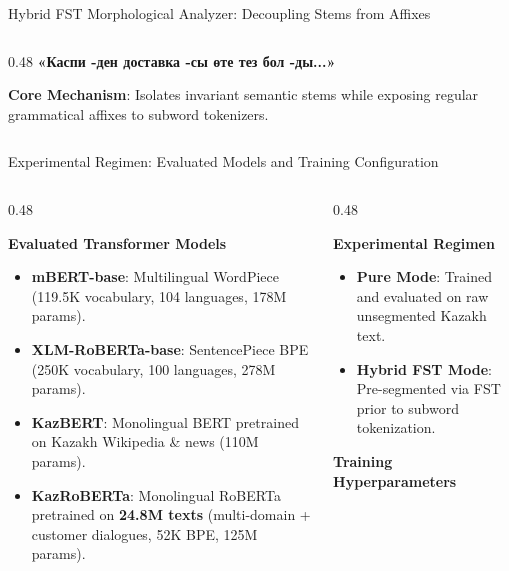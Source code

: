 \documentclass[aspectratio=169, 10pt]{beamer}
\newcommand{\subhead}[1]{{\normalsize\textbf{\color{DarkNavy}#1}\par\vspace{3pt}}}
\begin{document}
\begin{frame}{Hybrid FST Morphological Analyzer: Decoupling Stems from Affixes}
\begin{columns}[T]
\begin{column}{0.48\textwidth}
            {\footnotesize\color{DarkNavy}\textbf{«Каспи {\color{TechCyan}-ден} доставка {\color{TechCyan}-сы} өте тез бол {\color{TechCyan}-ды}...»}}\par
            \vspace{8pt}
            {\footnotesize\textbf{\color{DarkNavy}Core Mechanism}: Isolates invariant semantic stems while exposing regular grammatical affixes to subword tokenizers.}
        \end{column}
    \end{columns}
\end{frame}

\begin{frame}{Experimental Regimen: Evaluated Models and Training Configuration}
    \begin{columns}[T]
        \begin{column}{0.48\textwidth}
            \subhead{Evaluated Transformer Models}
            \begin{itemize}\setlength{\itemsep}{4pt}\small
                \item \textbf{mBERT-base}: Multilingual WordPiece (119.5K vocabulary, 104 languages, 178M params).
                \item \textbf{XLM-RoBERTa-base}: SentencePiece BPE (250K vocabulary, 100 languages, 278M params).
                \item \textbf{KazBERT}: Monolingual BERT pretrained on Kazakh Wikipedia \& news (110M params).
                \item \textbf{KazRoBERTa}: Monolingual RoBERTa pretrained on \textbf{24.8M texts} (multi-domain + customer dialogues, 52K BPE, 125M params).
            \end{itemize}
        \end{column}
        \begin{column}{0.48\textwidth}
            \subhead{Experimental Regimen}
            \begin{itemize}\setlength{\itemsep}{3pt}\small
                \item \textbf{Pure Mode}: Trained and evaluated on raw unsegmented Kazakh text.
                \item \textbf{Hybrid FST Mode}: Pre-segmented via FST prior to subword tokenization.
            \end{itemize}
            \vspace{6pt}
            \subhead{Training Hyperparameters}

\end{column}
\end{columns}
\end{frame}
\end{document}
